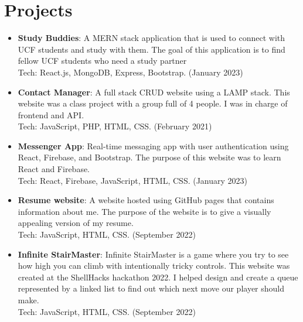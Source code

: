 \documentclass[a4paper,20pt]{article}
\newcommand{\resumeItem}[2]{
  \item\normalsize{
    \textbf{#1}{: #2 \vspace{1pt}}
  }
}
\newcommand{\resumeSubItem}[2]{\resumeItem{#1}{#2}\vspace{1pt}}
\newcommand{\resumeSubHeadingListStart}{\begin{itemize}[leftmargin=*]}
\newcommand{\resumeSubHeadingListEnd}{\end{itemize}}
\begin{document}
    \section{Projects}
        \resumeSubHeadingListStart
            \resumeSubItem{Study Buddies}{ A MERN stack application that is used to connect with UCF students and study with them. The goal of this application is to find fellow UCF students who need a study partner
            \\Tech: React.js, MongoDB, Express, Bootstrap. (January 2023)}
            \resumeSubItem{Contact Manager}{ A full stack CRUD website using a LAMP stack. This website was a class project with a group full of 4 people. I was in charge of frontend and API.
            \\Tech: JavaScript, PHP, HTML, CSS. (February 2021)}
            \resumeSubItem{Messenger App}{Real-time messaging app with user authentication using React, Firebase, and Bootstrap. The purpose of this website was to learn React and Firebase.
            \\Tech: React, Firebase, JavaScript, HTML, CSS. (January 2023)}
            \resumeSubItem{Resume website}{A website hosted using GitHub pages that contains information about me. The purpose of the website is to give a visually appealing version of my resume.\\Tech: JavaScript, HTML, CSS. (September 2022)}
            \resumeSubItem{Infinite StairMaster}{Infinite StairMaster is a game where you try to see how high you can climb with intentionally tricky controls. This website was created at the ShellHacks hackathon 2022. I helped design and create a queue represented by a linked list to find out which next move our player should make. \\Tech: JavaScript, HTML, CSS. (September 2022)}
            \vspace{2pt}
        \resumeSubHeadingListEnd


\end{document}
